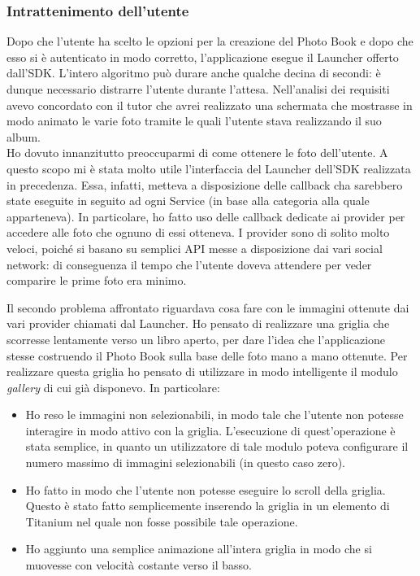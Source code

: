 			\subsubsection{Intrattenimento dell'utente}
				Dopo che l'utente ha scelto le opzioni per la creazione del Photo Book e dopo che esso si è autenticato in modo
				corretto, l'applicazione esegue il Launcher offerto dall'SDK. L'intero algoritmo può durare anche qualche decina di
				secondi: è dunque necessario distrarre l'utente durante l'attesa. Nell'analisi dei requisiti avevo concordato
				con il tutor che avrei realizzato una schermata che mostrasse in modo animato le varie foto tramite le quali
				l'utente stava realizzando il suo album.\\
				Ho dovuto innanzitutto preoccuparmi di come ottenere le foto dell'utente. A questo scopo mi è stata molto utile
				l'interfaccia del Launcher dell'SDK realizzata in precedenza. Essa, infatti, metteva a disposizione delle callback
				cha sarebbero state eseguite in seguito ad ogni Service (in base alla categoria alla quale apparteneva). In
				particolare, ho fatto uso delle callback dedicate ai provider per accedere alle foto che ognuno di essi otteneva. I
				provider sono di solito molto veloci, poiché si basano su semplici API messe a disposizione dai vari social network:
				di conseguenza il tempo che l'utente doveva attendere per veder comparire le prime foto era minimo.
				
				Il secondo problema affrontato riguardava cosa fare con le immagini ottenute dai vari provider chiamati dal Launcher.
				Ho pensato di realizzare una griglia che scorresse lentamente verso un libro aperto, per dare l'idea che
				l'applicazione stesse costruendo il Photo Book sulla base delle foto mano a mano ottenute. Per realizzare questa
				griglia ho pensato di utilizzare in modo intelligente il modulo \emph{gallery} di cui già disponevo. In particolare:
				\begin{itemize}
					\item Ho reso le immagini non selezionabili, in modo tale che l'utente non potesse interagire in modo attivo
					con la griglia. L'esecuzione di quest'operazione è stata semplice, in quanto un utilizzatore di tale modulo
					poteva configurare il numero massimo di immagini selezionabili (in questo caso zero).
					\item Ho fatto in modo che l'utente non potesse eseguire lo scroll della griglia. Questo è stato fatto
					semplicemente inserendo la griglia in un elemento di Titanium nel quale non fosse possibile tale operazione.
					\item Ho aggiunto una semplice animazione all'intera griglia in modo che si muovesse con velocità costante
					verso il basso.
				\end{itemize}
